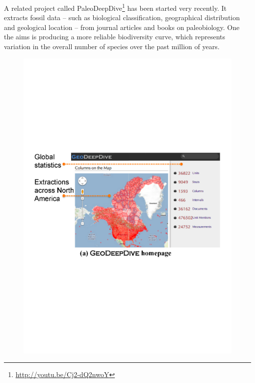 A related project called PaleoDeepDive\footnote{\url{http://youtu.be/Cj2-dQ2nwoY}} has been started very recently.
It extracts fossil data -- such as biological classification, geographical distribution and geological location -- from journal articles and books on paleobiology.
One the aims is producing a more reliable biodiversity curve, which represents variation in the overall number of species over the past million of years.

\begin{figure}
\begin{center}
\includegraphics[scale=0.6]{figures/geodeepdive-1.pdf}

\end{center}
\end{figure}
